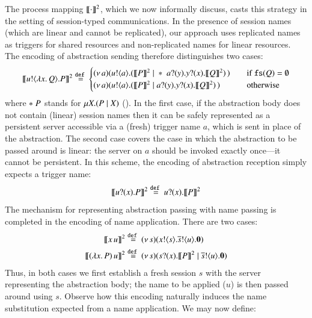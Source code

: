 \documentclass[preprint,11pt]{elsarticle}
\begin{document}
{The process mapping $\llbracket\cdot\rrbracket^2$, which we now informally discuss,
casts this strategy in the setting of session-typed communications. 
In the presence of session names (which are linear  and cannot be replicated),
our
approach %
 uses replicated names
as triggers for shared resources and non-replicated names
for linear resources. The encoding of abstraction sending therefore distinguishes two cases:
$$
	\pmap{\bout{u}{\abs{x}{Q}} P}{2}  \defeq  
	\begin{cases}
		\newsp{a}{\bout{u}{a} (\pmap{P}{2} \Par \repl{\binp{a}{y} \binp{y}{x} \pmap{Q}{2})}\,}\quad
		& \text{if $\fs{Q} = \emptyset$}
		\\
		\newsp{a}{\bout{u}{a} (\pmap{P}{2} \Par \binp{a}{y} \binp{y}{x} \pmap{Q}{2})\,}\quad
		& \text{otherwise} %
	\end{cases}
	$$
	where  $\ast\;P$ stands for $\mu X. (P \;|\; X)$ ().
	In the first case, if the abstraction body does not contain (linear) session names then it can be safely 
	represented as a persistent server accessible via a (fresh) trigger name $a$, which is sent in place of the abstraction. The second case covers the case in which the abstraction to be passed around 
	is linear: the server on $a$ should be invoked exactly once---it cannot be persistent.
	In this scheme, the encoding of abstraction reception simply expects a trigger name:
   $$
   \llbracket u ? (x) . P\rrbracket^2 \stackrel{\mathtt{def}\ }{=}  u ? (x) . \llbracket P\rrbracket^2
   $$
	The mechanism for representing abstraction passing with name passing is completed in the encoding of name application. There are two cases:
	\begin{align*}
		\pmap{\appl{x}{u}}{2} &\defeq \newsp{s}{\bout{x}{s} \bout{\dual{s}}{u} \inact}
	\\
	\pmap{\appl{(\abs{x}{P})}{u}}{2} & \defeq  %
	\newsp{s}{\binp{s}{x} \pmap{P}{2} \Par \bout{\dual{s}}{u} \inact}
\end{align*}
Thus,   in both cases we first establish a fresh session $s$   with the server representing the abstraction body;
the name to be applied ($u$) is then passed around using $s$.
Observe how %
this encoding
naturally induces the name substitution expected from a name application.
We may now define:


}
\end{document}
